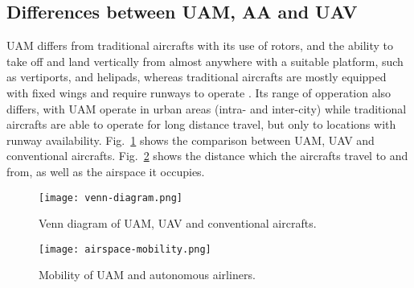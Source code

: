 \subsection{Differences between UAM, AA and UAV}

\Gls{UAM} differs from traditional aircrafts with its use of rotors, and the ability to take off and land vertically from almost anywhere with a suitable platform, such as vertiports, and helipads, whereas traditional aircrafts are mostly equipped with fixed wings and require runways to operate \cite{Schuchardt_2023}.
Its range of opperation also differs, with \gls{UAM} operate in urban areas (intra- and inter-city) while traditional aircrafts are able to operate for long distance travel, but only to locations with runway availability.
Fig.~\ref{fig:venn-diagram} shows the comparison between \gls{UAM}, \gls{UAV} and conventional aircrafts.
Fig.~\ref{fig:airspace-mobility} shows the distance which the aircrafts travel to and from, as well as the airspace it occupies.

\begin{figure}[h]
    \centering
    \texttt{[image: venn-diagram.png]}
    \caption{Venn diagram of \gls{UAM}, \gls{UAV} and conventional aircrafts.}
    \label{fig:venn-diagram}
\end{figure}

\begin{figure}[h]
    \centering
    \texttt{[image: airspace-mobility.png]}
    \caption{Mobility of \gls{UAM} and autonomous airliners.}
    \label{fig:airspace-mobility}
\end{figure}
